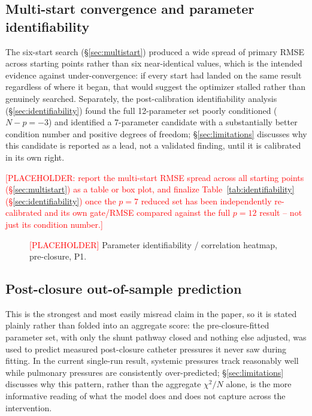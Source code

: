 \documentclass{article}
\begin{document}
\subsection{Multi-start convergence and parameter identifiability}
\label{sec:results_identifiability}

The six-start search (\S\ref{sec:multistart}) produced a wide spread of primary RMSE across starting points rather than six near-identical values, which is the intended evidence against under-convergence: if every start had landed on the same result regardless of where it began, that would suggest the optimizer stalled rather than genuinely searched. Separately, the post-calibration identifiability analysis (\S\ref{sec:identifiability}) found the full 12-parameter set poorly conditioned ($N-p=-3$) and identified a 7-parameter candidate with a substantially better condition number and positive degrees of freedom; \S\ref{sec:limitations} discusses why this candidate is reported as a lead, not a validated finding, until it is calibrated in its own right.

\textcolor{red}{[PLACEHOLDER: report the multi-start RMSE spread across all
starting points (\S\ref{sec:multistart}) as a table or box plot, and
finalize Table~\ref{tab:identifiability} (\S\ref{sec:identifiability}) once
the $p{=}7$ reduced set has been independently re-calibrated and its own
gate/RMSE compared against the full $p{=}12$ result -- not just its
condition number.]}

\begin{figure}[h]
    \centering
    \caption{\textcolor{red}{[PLACEHOLDER]} Parameter identifiability / correlation heatmap, pre-closure, P1.}
    \label{fig:identifiability_heatmap}
\end{figure}

\subsection{Post-closure out-of-sample prediction}
\label{sec:post_closure_results}
\label{sec:results_post_closure}

This is the strongest and most easily misread claim in the paper, so it is stated plainly rather than folded into an aggregate score: the pre-closure-fitted parameter set, with only the shunt pathway closed and nothing else adjusted, was used to predict measured post-closure catheter pressures it never saw during fitting. In the current single-run result, systemic pressures track reasonably well while pulmonary pressures are consistently over-predicted; \S\ref{sec:limitations} discusses why this pattern, rather than the aggregate $\chi^2/N$ alone, is the more informative reading of what the model does and does not capture across the intervention.
\end{document}
